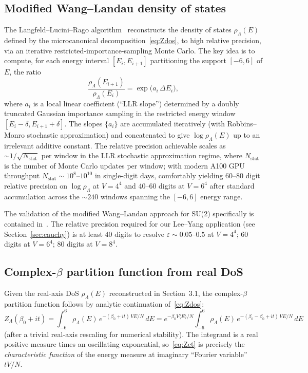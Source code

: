 \documentclass[11pt,a4paper]{article}
\theoremstyle{definition}
\theoremstyle{remark}
\begin{document}
\subsection{Modified Wang--Landau density of states}

The Langfeld--Lucini--Rago algorithm~\cite{LangfeldLuciniRago2012}
reconstructs the density of states $\rho_\Lambda(E)$ defined by
the microcanonical decomposition~\eqref{eq:Zdos}, to high relative
precision, via an iterative restricted-importance-sampling Monte
Carlo. The key idea is to compute, for each energy interval
$[E_i, E_{i+1}]$ partitioning the support $[-6, 6]$ of $E$, the
ratio
\begin{equation}
\frac{\rho_\Lambda(E_{i+1})}{\rho_\Lambda(E_i)}
= \exp\bigl( a_i \,\Delta E_i \bigr),
\label{eq:LLR-slopes}
\end{equation}
where $a_i$ is a local linear coefficient (``LLR slope'') determined
by a doubly truncated Gaussian importance sampling in the
restricted energy window $[E_i - \delta, E_{i+1} + \delta]$. The
slopes $\{a_i\}$ are accumulated iteratively (with Robbins--Monro
stochastic approximation) and concatenated to give
$\log \rho_\Lambda(E)$ up to an irrelevant additive constant.
The relative precision achievable scales as
$\sim 1/\sqrt{N_{\mathrm{stat}}}$ per window in the LLR
stochastic approximation regime, where $N_{\mathrm{stat}}$ is the
number of Monte Carlo updates per window; with modern A100 GPU
throughput $N_{\mathrm{stat}} \sim 10^{8}$--$10^{10}$ in
single-digit days, comfortably yielding 60--80 digit relative
precision on $\log \rho_\Lambda$ at $V = 4^4$ and 40--60 digits
at $V = 6^4$ after standard accumulation across the $\sim 240$
windows spanning the $[-6, 6]$ energy range.

The validation of the modified Wang--Landau approach for SU(2)
specifically is contained in~\cite{LangfeldLuciniRago2012}. The
relative precision required for our Lee--Yang application (see
Section~\ref{sec:cauchy}) is at least 40 digits to resolve
$\varepsilon \sim 0.05$--$0.5$ at $V = 4^4$;
60 digits at $V = 6^4$; 80 digits at $V = 8^4$.

\subsection{Complex-$\beta$ partition function from real DoS}

Given the real-axis DoS $\rho_\Lambda(E)$ reconstructed in
Section~3.1, the complex-$\beta$ partition function follows by
analytic continuation of~\eqref{eq:Zdos}:
\begin{equation}
Z_\Lambda(\beta_0 + i t)
= \int_{-6}^{6} \rho_\Lambda(E)\,
e^{-(\beta_0 + i t)\,V E / N}\, dE
= e^{-\beta_0 V \langle E\rangle/N}
\!\int_{-6}^{6} \rho_\Lambda(E)\,
e^{-(\beta_0 - \beta_0 + it)\,V E / N}\, dE
\label{eq:Zct}
\end{equation}
(after a trivial real-axis rescaling for numerical stability).
The integrand is a real positive measure times an oscillating
exponential, so~\eqref{eq:Zct} is precisely the
\emph{characteristic function} of the energy measure at imaginary
``Fourier variable'' $tV/N$.
\end{document}
